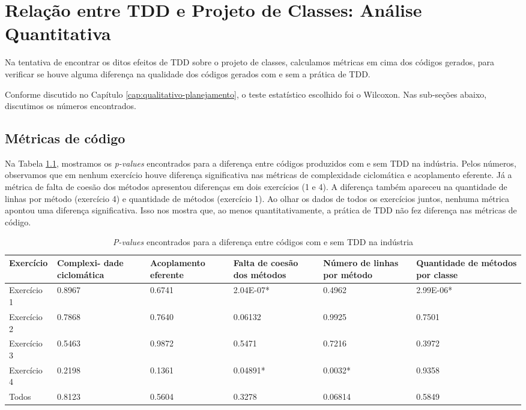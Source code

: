 \chapter{Relação entre TDD e Projeto de Classes: Análise Quantitativa}
\label{cap:analise-quantitativa}

Na tentativa de encontrar os ditos efeitos de TDD sobre o projeto de classes,
calculamos métricas em cima dos códigos gerados, para verificar se houve
alguma diferença na qualidade dos códigos gerados com e sem a prática de TDD.

Conforme discutido no Capítulo \ref{cap:qualitativo-planejamento}, o teste
estatístico escolhido foi o Wilcoxon. 
Nas sub-seções abaixo, discutimos os números encontrados.

\section{Métricas de código}

Na Tabela \ref{metricas-industria}, mostramos os \textit{p-values} encontrados para
a diferença entre códigos produzidos com e sem TDD na indústria. 
Pelos números, 
observamos que em nenhum exercício houve diferença significativa nas métricas
de complexidade ciclomática e acoplamento eferente. Já a métrica de falta
de coesão dos métodos apresentou diferenças em dois exercícios (1 e 4). 
A diferença também apareceu na quantidade de linhas por método (exercício 4)
e quantidade de métodos (exercício 1). Ao olhar os dados de todos os exercícios
juntos, nenhuma métrica apontou uma diferença significativa.
Isso nos mostra que, ao menos quantitativamente, a prática de TDD não fez
diferença nas métricas de código.

\begin{table}[h!]
	\centering
	\begin{tabular}{ | p{3cm} | p{2cm} | p{2cm} | p{2cm} | p{2cm} | p{2cm} |}
		\hline
		Exercício & Complexi- dade ciclomática & Acoplamento eferente & Falta de coesão dos métodos & Número de linhas por método 
		& Quantidade de métodos por classe \\
		\hline
		Exercício 1 &	0.8967	&	0.6741 &	\cellcolor[gray]{0.8}2.04E-07* &	0.4962 &	\cellcolor[gray]{0.8}2.99E-06* \\
		Exercício 2	& 0.7868	&	0.7640 &	0.06132 &	0.9925 &	0.7501 \\
		Exercício 3	& 0.5463	&	0.9872 &	0.5471 &	0.7216 &	0.3972\\
		Exercício 4	& 0.2198	&	0.1361 &	\cellcolor[gray]{0.8}0.04891* &	\cellcolor[gray]{0.8}0.0032* &	0.9358\\
		\hline
		Todos &	0.8123	&	0.5604 &	0.3278 &	0.06814 &	0.5849\\
		\hline
	\end{tabular}
	\caption{\textit{P-values} encontrados para a diferença entre códigos com e sem TDD na indústria}
	\label{metricas-industria}
\end{table}

